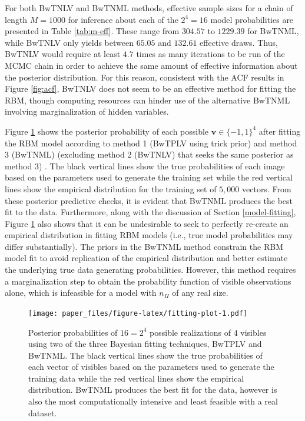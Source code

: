 \documentclass[12pt]{article}
\theoremstyle{definition}
\newcommand{\nh}{{n_{\scriptscriptstyle H}}}
\begin{document}
For both BwTNLV and BwTNML methods, effective sample sizes for a chain
of length \(M = 1000\) for inference about each of the \(2^4 = 16\)
model probabilities are presented in Table \ref{tab:m-eff}. These range
from \(304.57\) to \(1229.39\) for BwTNML, while BwTNLV only yields
between \(65.05\) and \(132.61\) effective draws. Thus, BwTNLV would
require at least \(4.7\) times as many iterations to be run of the MCMC
chain in order to achieve the same amount of effective information about
the posterior distribution. For this reason, consistent with the ACF
results in Figure \ref{fig:acf}, BwTNLV does not seem to be an effective
method for fitting the RBM, though computing resources can hinder use of
the alternative BwTNML involving marginalization of hidden variables.

Figure \ref{fig:fitting-plot} shows the posterior probability of each
possible \(\boldsymbol v \in \{-1,1\}^4\) after fitting the RBM model
according to method 1 (BwTPLV using trick prior) and method 3 (BwTNML)
(excluding method 2 (BwTNLV) that seeks the same posterior as method 3)
. The black vertical lines show the true probabilities of each image
based on the parameters used to generate the training set while the red
vertical lines show the empirical distribution for the training set of
\(5,000\) vectors. From these posterior predictive checks, it is evident
that BwTNML produces the best fit to the data. Furthermore, along with
the discussion of Section \ref{model-fitting}, Figure
\ref{fig:fitting-plot} also shows that it can be undesirable to seek to
perfectly re-create an empirical distribution in fitting RBM models
(i.e., true model probabilities may differ substantially). The priors in
the BwTNML method constrain the RBM model fit to avoid replication of
the empirical distribution and better estimate the underlying true data
generating probabilities. However, this method requires a
marginalization step to obtain the probability function of visible
observations alone, which is infeasible for a model with \(\nh\) of any
real size. \par
\begin{figure}
\centering
\texttt{[image: paper\_files/figure-latex/fitting-plot-1.pdf]}
\caption{\label{fig:fitting-plot}Posterior probabilities of \(16 = 2^4\)
possible realizations of \(4\) visibles using two of the three Bayesian
fitting techniques, BwTPLV and BwTNML. The black vertical lines show the
true probabilities of each vector of visibles based on the parameters
used to generate the training data while the red vertical lines show the
empirical distribution. BwTNML produces the best fit for the data,
however is also the most computationally intensive and least feasible
with a real dataset.}
\end{figure}
\end{document}
